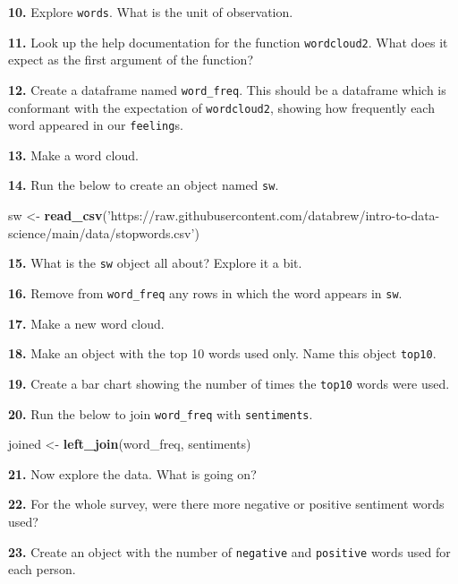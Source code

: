 \documentclass[]{book}
\newenvironment{Shaded}{\begin{snugshade}}{\end{snugshade}}
\newcommand{\KeywordTok}[1]{\textcolor[rgb]{0.13,0.29,0.53}{\textbf{#1}}}
\newcommand{\NormalTok}[1]{#1}
\newcommand{\StringTok}[1]{\textcolor[rgb]{0.31,0.60,0.02}{#1}}
\begin{document}
\textbf{10.} Explore \texttt{words}. What is the unit of observation.

\textbf{11.} Look up the help documentation for the function \texttt{wordcloud2}. What does it expect as the first argument of the function?

\textbf{12.} Create a dataframe named \texttt{word\_freq}. This should be a dataframe which is conformant with the expectation of \texttt{wordcloud2}, showing how frequently each word appeared in our \texttt{feeling}s.

\textbf{13.} Make a word cloud.

\textbf{14.} Run the below to create an object named \texttt{sw}.

\begin{Shaded}
\begin{Highlighting}[]
\NormalTok{sw <-}\StringTok{ }\KeywordTok{read_csv}\NormalTok{(}\StringTok{'https://raw.githubusercontent.com/databrew/intro-to-data-science/main/data/stopwords.csv'}\NormalTok{)}
\end{Highlighting}
\end{Shaded}

\textbf{15.} What is the \texttt{sw} object all about? Explore it a bit.

\textbf{16.} Remove from \texttt{word\_freq} any rows in which the word appears in \texttt{sw}.

\textbf{17.} Make a new word cloud.

\textbf{18.} Make an object with the top 10 words used only. Name this object \texttt{top10}.

\textbf{19.} Create a bar chart showing the number of times the \texttt{top10} words were used.

\textbf{20.} Run the below to join \texttt{word\_freq} with \texttt{sentiments}.

\begin{Shaded}
\begin{Highlighting}[]
\NormalTok{joined <-}\StringTok{ }\KeywordTok{left_join}\NormalTok{(word_freq, sentiments)}
\end{Highlighting}
\end{Shaded}

\textbf{21.} Now explore the data. What is going on?

\textbf{22.} For the whole survey, were there more negative or positive sentiment words used?

\textbf{23.} Create an object with the number of \texttt{negative} and \texttt{positive} words used for each person.
\end{document}

